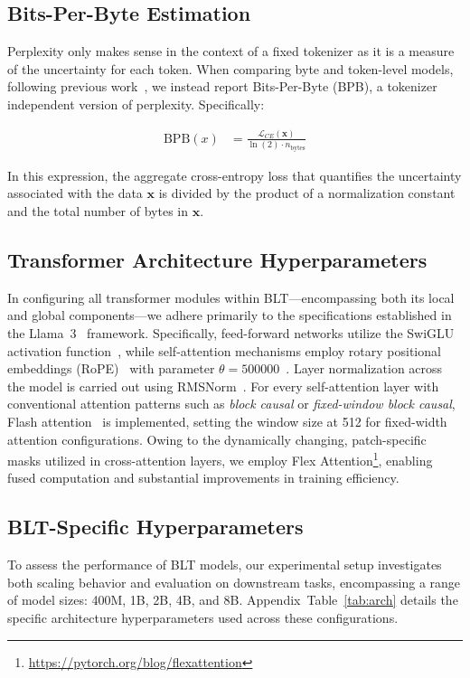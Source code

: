 \subsection{Bits-Per-Byte Estimation} Perplexity only makes sense in the context of a fixed tokenizer as it is a measure of the uncertainty for each token. When comparing byte and token-level models, following previous work~\citep{xue2022byt5, yu2023megabyte, wang2024mambabyte}, we instead report Bits-Per-Byte (BPB), a tokenizer independent version of perplexity. Specifically:

\begin{align}
    \text{BPB}(x)&= \frac{\mathcal{L}_{CE}(\pmb{x})}{\ln(2)\cdot n_{\text{bytes}}}
\end{align}

In this expression, the aggregate cross-entropy loss that quantifies the uncertainty associated with the data $\pmb{x}$ is divided by the product of a normalization constant and the total number of bytes in $\pmb{x}$.

\subsection{Transformer Architecture Hyperparameters} In configuring all transformer modules within {\textsc BLT}—encompassing both its local and global components—we adhere primarily to the specifications established in the Llama~3~\citep{dubey2024llama} framework. Specifically, feed-forward networks utilize the SwiGLU activation function~\citep{swiglu}, while self-attention mechanisms employ rotary positional embeddings (RoPE)~\citep{RoPe} with parameter $\theta=500000$~\citep{xiong2024effective}. Layer normalization across the model is carried out using RMSNorm~\citep{RMSNorm}. For every self-attention layer with conventional attention patterns such as \textit{block causal} or \textit{fixed-window block causal}, Flash attention~\citep{dao2022flashattention} is implemented, setting the window size at 512 for fixed-width attention configurations. Owing to the dynamically changing, patch-specific masks utilized in cross-attention layers, we employ Flex Attention\footnote{\url{https://pytorch.org/blog/flexattention}}, enabling fused computation and substantial improvements in training efficiency.

\subsection{{\textsc BLT}-Specific Hyperparameters} To assess the performance of {\textsc BLT} models, our experimental setup investigates both scaling behavior and evaluation on downstream tasks, encompassing a range of model sizes: 400M, 1B, 2B, 4B, and 8B. Appendix~Table~\ref{tab:arch} details the specific architecture hyperparameters used across these configurations. 

